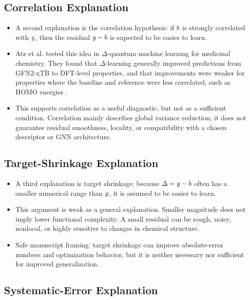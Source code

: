 \documentclass[11pt]{article}
\begin{document}
\subsection*{Correlation Explanation}

\begin{itemize}
  \item A second explanation is the correlation hypothesis: if \(b\) is strongly correlated with \(y\), then the residual \(y - b\) is expected to be easier to learn.

  \item Atz et al. tested this idea in \(\Delta\)-quantum machine learning for medicinal chemistry. They found that \(\Delta\)-learning generally improved predictions from GFN2-xTB to DFT-level properties, and that improvements were weaker for properties where the baseline and reference were less correlated, such as HOMO energies \cite{atz2022deltaqml}.

  \item This supports correlation as a useful diagnostic, but not as a sufficient condition. Correlation mainly describes global variance reduction; it does not guarantee residual smoothness, locality, or compatibility with a chosen descriptor or GNN architecture.
\end{itemize}

\subsection*{Target-Shrinkage Explanation}

\begin{itemize}
  \item A third explanation is target shrinkage: because \(\Delta = y - b\) often has a smaller numerical range than \(y\), it is assumed to be easier to learn.

  \item This argument is weak as a general explanation. Smaller magnitude does not imply lower functional complexity. A small residual can be rough, noisy, nonlocal, or highly sensitive to changes in chemical structure.

  \item Safe manuscript framing: target shrinkage can improve absolute-error numbers and optimization behavior, but it is neither necessary nor sufficient for improved generalization.
\end{itemize}

\subsection*{Systematic-Error Explanation}
\end{document}
